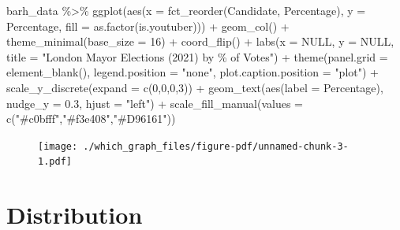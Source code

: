 \documentclass[
  letterpaper,
]{book}
\newenvironment{Shaded}{\begin{snugshade}}{\end{snugshade}}
\newcommand{\AttributeTok}[1]{\textcolor[rgb]{0.40,0.45,0.13}{#1}}
\newcommand{\ConstantTok}[1]{\textcolor[rgb]{0.56,0.35,0.01}{#1}}
\newcommand{\DecValTok}[1]{\textcolor[rgb]{0.68,0.00,0.00}{#1}}
\newcommand{\FloatTok}[1]{\textcolor[rgb]{0.68,0.00,0.00}{#1}}
\newcommand{\FunctionTok}[1]{\textcolor[rgb]{0.28,0.35,0.67}{#1}}
\newcommand{\NormalTok}[1]{\textcolor[rgb]{0.00,0.23,0.31}{#1}}
\newcommand{\SpecialCharTok}[1]{\textcolor[rgb]{0.37,0.37,0.37}{#1}}
\newcommand{\StringTok}[1]{\textcolor[rgb]{0.13,0.47,0.30}{#1}}
\begin{document}
\begin{Shaded}
\begin{Highlighting}[]
\NormalTok{barh\_data }\SpecialCharTok{\%\textgreater{}\%}
\FunctionTok{ggplot}\NormalTok{(}\FunctionTok{aes}\NormalTok{(}\AttributeTok{x =} \FunctionTok{fct\_reorder}\NormalTok{(Candidate, Percentage), }\AttributeTok{y =}\NormalTok{ Percentage, }\AttributeTok{fill =} \FunctionTok{as.factor}\NormalTok{(is.youtuber))) }\SpecialCharTok{+}
\FunctionTok{geom\_col}\NormalTok{() }\SpecialCharTok{+} 
\FunctionTok{theme\_minimal}\NormalTok{(}\AttributeTok{base\_size =} \DecValTok{16}\NormalTok{) }\SpecialCharTok{+} 
\FunctionTok{coord\_flip}\NormalTok{() }\SpecialCharTok{+} 
\FunctionTok{labs}\NormalTok{(}\AttributeTok{x =} \ConstantTok{NULL}\NormalTok{, }\AttributeTok{y =} \ConstantTok{NULL}\NormalTok{, }\AttributeTok{title =} \StringTok{"London Mayor Elections (2021) by \% of Votes"}\NormalTok{) }\SpecialCharTok{+} 
\FunctionTok{theme}\NormalTok{(}\AttributeTok{panel.grid =} \FunctionTok{element\_blank}\NormalTok{(), }\AttributeTok{legend.position =} \StringTok{"none"}\NormalTok{, }\AttributeTok{plot.caption.position =} \StringTok{"plot"}\NormalTok{) }\SpecialCharTok{+} 
\FunctionTok{scale\_y\_discrete}\NormalTok{(}\AttributeTok{expand =} \FunctionTok{c}\NormalTok{(}\DecValTok{0}\NormalTok{,}\DecValTok{0}\NormalTok{,}\DecValTok{0}\NormalTok{,}\DecValTok{3}\NormalTok{)) }\SpecialCharTok{+} 
\FunctionTok{geom\_text}\NormalTok{(}\FunctionTok{aes}\NormalTok{(}\AttributeTok{label =}\NormalTok{ Percentage), }\AttributeTok{nudge\_y =} \FloatTok{0.3}\NormalTok{, }\AttributeTok{hjust =} \StringTok{"left"}\NormalTok{)  }\SpecialCharTok{+} 
\FunctionTok{scale\_fill\_manual}\NormalTok{(}\AttributeTok{values =} \FunctionTok{c}\NormalTok{(}\StringTok{"\#c0bfff"}\NormalTok{,}\StringTok{"\#f3e408"}\NormalTok{,}\StringTok{"\#D96161"}\NormalTok{)) }
\end{Highlighting}
\end{Shaded}

\begin{figure}[H]

{\centering \texttt{[image: ./which\_graph\_files/figure-pdf/unnamed-chunk-3-1.pdf]}

}

\end{figure}

\hypertarget{distribution}{%
\section{Distribution}\label{distribution}}
\end{document}
